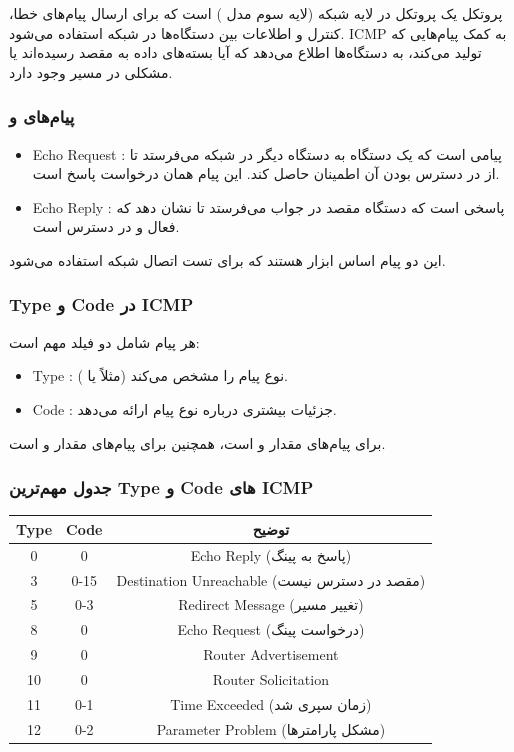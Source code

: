 	پروتکل  یک پروتکل در لایه شبکه (لایه سوم مدل ) است که برای ارسال پیام‌های خطا، کنترل و اطلاعات بین دستگاه‌ها در شبکه استفاده می‌شود. ICMP به کمک پیام‌هایی که تولید می‌کند، به دستگاه‌ها اطلاع می‌دهد که آیا بسته‌های داده به مقصد رسیده‌اند یا مشکلی در مسیر وجود دارد.
	
	\subsubsection*{پیام‌های  و }
	\begin{itemize}
		\item {Echo Request} : پیامی است که یک دستگاه به دستگاه دیگر در شبکه می‌فرستد تا از در دسترس بودن آن اطمینان حاصل کند. این پیام همان درخواست پاسخ است.
		\item {Echo Reply} : پاسخی است که دستگاه مقصد در جواب  می‌فرستد تا نشان دهد که فعال و در دسترس است.
	\end{itemize}
	این دو پیام اساس ابزار  هستند که برای تست اتصال شبکه استفاده می‌شود.
	
	\subsubsection*{Type و Code در ICMP}
	هر پیام  شامل دو فیلد مهم است:  
	\begin{itemize}
		\item {Type} : نوع پیام را مشخص می‌کند (مثلاً  یا ).  
		\item {Code} : جزئیات بیشتری درباره نوع پیام ارائه می‌دهد.
	\end{itemize}
برای پیام‌های  مقدار  و  است، همچنین برای پیام‌های  مقدار  و  است.
	
	\subsubsection*{جدول مهم‌ترین Type و Code های ICMP}
	\begin{center}
		\begin{tabular}{|c|c|c|}
			\hline
			\textbf{Type} & \textbf{Code} & \textbf{توضیح} \\
			\hline
			0 & 0 & Echo Reply (پاسخ به پینگ) \\
			\hline
			3 & 0-15 & Destination Unreachable (مقصد در دسترس نیست) \\
			\hline
			5 & 0-3 & Redirect Message (تغییر مسیر) \\
			\hline
			8 & 0 & Echo Request (درخواست پینگ) \\
			\hline
			9 & 0 & Router Advertisement \\
			\hline
			10 & 0 & Router Solicitation \\
			\hline
			11 & 0-1 & Time Exceeded (زمان سپری شد) \\
			\hline
			12 & 0-2 & Parameter Problem (مشکل پارامترها) \\
			\hline
		\end{tabular}
	\end{center}
	
